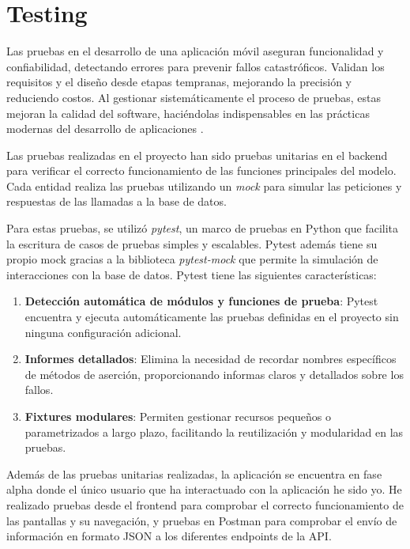 \chapter{Testing}

Las pruebas en el desarrollo de una aplicación móvil aseguran funcionalidad y confiabilidad, detectando errores para prevenir fallos catastróficos. Validan los requisitos y el diseño desde etapas tempranas, mejorando la precisión y reduciendo costos. Al gestionar sistemáticamente el proceso de pruebas, estas mejoran la calidad del software, haciéndolas indispensables en las prácticas modernas del desarrollo de aplicaciones \cite{zhu}.

Las pruebas realizadas en el proyecto han sido pruebas unitarias en el backend para verificar el correcto funcionamiento de las funciones principales del modelo. Cada entidad realiza las pruebas utilizando un \textit{mock} para simular las peticiones y respuestas de las llamadas a la base de datos.

Para estas pruebas, se utilizó \textit{pytest}, un marco de pruebas en Python que facilita la escritura de casos de pruebas simples y escalables. Pytest además tiene su propio mock gracias a la biblioteca \textit{pytest-mock} que permite la simulación de interacciones con la base de datos. Pytest tiene las siguientes características:

\begin{enumerate}
    \item \textbf{Detección automática de módulos y funciones de prueba}: Pytest encuentra y ejecuta automáticamente las pruebas definidas en el proyecto sin ninguna configuración adicional.
    \item \textbf{Informes detallados}: Elimina la necesidad de recordar nombres específicos de métodos de aserción, proporcionando informas claros y detallados sobre los fallos.
    \item \textbf{Fixtures modulares}: Permiten gestionar recursos pequeños o parametrizados a largo plazo, facilitando la reutilización y modularidad en las pruebas.
\end{enumerate}

Además de las pruebas unitarias realizadas, la aplicación se encuentra en fase alpha donde el único usuario que ha interactuado con la aplicación he sido yo. He realizado pruebas desde el frontend para comprobar el correcto funcionamiento de las pantallas y su navegación, y pruebas en Postman para comprobar el envío de información en formato JSON a los diferentes endpoints de la API.